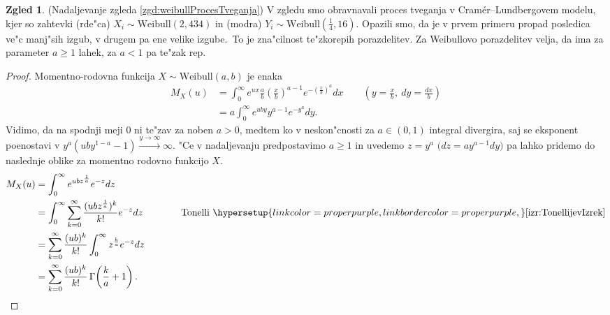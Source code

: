 \documentclass[12pt, a4paper, reqno]{amsart}
\theoremstyle{definition}
\newtheorem{zgled}[definicija]{Zgled}
\theoremstyle{plain}
\newcommand{\1}{\mathds{1}}
\newcommand*{\refPriloga}[1]{%
  \begingroup
    \hypersetup{
      linkcolor=properpurple,
      linkbordercolor=properpurple,
    }%
    \ref{#1}%
  \endgroup
}
\begin{document}
        \begin{zgled}(Nadaljevanje zgleda \ref{zgd:weibullProcesTveganja})
            V zgledu smo obravnavali proces tveganja v Cramér--Lundbergovem 
            modelu, kjer so zahtevki (rde"ca) $X_i\sim\text{Weibull}(2, 434)$ in (modra) 
            $Y_i\sim\text{Weibull}(\tfrac{1}{4}, 16)$. Opazili smo, da je v prvem primeru propad
            posledica ve"c manj"sih izgub, v drugem pa ene velike izgube.\ To je zna"cilnost te"zkorepih
            porazdelitev. Za Weibullovo porazdelitev velja, da ima za parameter
            $a \geq 1$ lahek, za $a<1$ pa te"zak rep.
            \begin{proof}
                Momentno-rodovna funkcija $X\sim\text{Weibull}(a, b)$ je enaka
                \begin{align*}
                    M_X(u) &= \int_{0}^{\infty}e^{ux}\frac{a}{b}\left(\frac{x}{b}\right)^{a-1}e^{-\left(\frac{x}{b}\right)^a}dx \qquad \left(y = \tfrac{x}{b},\ dy = \tfrac{dx}{b}\right) \\
                           &= a\int_{0}^{\infty}e^{uby} y^{a-1}e^{-y^a}dy.
                \end{align*}
                Vidimo, da na spodnji meji $0$ ni te"zav za noben $a > 0$, medtem ko v neskon"cnosti 
                za $a\in(0, 1)$ integral divergira, saj se 
                eksponent poenostavi v $y^a(uby^{1 - a} - 1)\xrightarrow{y\to\infty}\infty$. "Ce v 
                nadaljevanju predpostavimo $a\geq 1$ in uvedemo $z = y^a$ 
                $\bigl(dz = ay^{a-1}dy\bigr)$ pa lahko pridemo do naslednje oblike 
                za momentno rodovno funkcijo $X$. \phantom{\qedhere}
                \begin{align*}
                    M_X(u) &= \int_{0}^{\infty}e^{ubz^{\frac{1}{a}}}e^{-z}dz \\
                           &= \int_{0}^{\infty}\sum_{k=0}^{\infty}\frac{(ubz^{\frac{1}{a}})^k}{k!}e^{-z}dz \qquad \qquad \text{Tonelli} \ \refPriloga{izr:TonellijevIzrek} \\
                           &= \sum_{k=0}^{\infty}\frac{(ub)^k}{k!}\int_{0}^{\infty}z^{\frac{k}{a}}e^{-z}dz \\
                           &= \sum_{k=0}^{\infty}\frac{(ub)^k}{k!} \, \Gamma \! \left(\frac{k}{a} + 1\right).
                \end{align*} 
            \end{proof}
            \label{zgd:weibullLahkorepnaPorazdelitev}
        \end{zgled}
\end{document}
